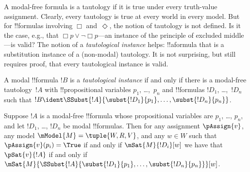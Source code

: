 \documentclass[../../../include/open-logic-section]{subfiles}
\begin{document}


\begin{explain}
A modal-free formula is a tautology if it is true under every
truth-value assignment. Clearly, every tautology is true at every
world in every model. But for !!{formula}s involving $\Box$
and~$\Diamond$, the notion of tautology is not defined. Is it the
case, e.g., that $\Box p \lor \lnot \Box p$---an instance of the
principle of excluded middle---is valid? The notion of a
\emph{tautological instance} helps: !!a{formula} that is a
substitution instance of a (non-modal) tautology. It is not
surprising, but still requires proof, that every tautological instance
is valid.
\end{explain}

\begin{defn}
  A modal !!{formula} $!B$ is a \emph{tautological instance} if and
  only if there is a modal-free tautology~$!A$ with !!{propositional
    variable}s $p_1$, \dots,~$p_n$ and !!{formula}s $!D_1$,
  \dots,~$!D_n$ such that $!B \ident \SSubst{!A}{\subst{!D_1}{p_1},
    \dots, \subst{!D_n}{p_n}}$.
\end{defn}

\begin{lem}
  Suppose $!A$ is a modal-free !!{formula} whose propositional
  variables are $p_1$, \dots, $p_n$, and let $!D_1$, \dots,
  $!D_n$ be modal !!{formula}s. Then for any assignment $\pAssign{v}$,
  any model $\mModel{M} = \tuple{W, R, V}$, and any $w \in W$ such
  that $\pAssign{v}(p_i) = \True$ if and only if $\mSat{M}{!D_i}[w]$ we have
  that $\pSat{v}{!A}$ if and only if
  $\mSat{M}{\SSubst{!A}{\subst{!D_1}{p_1}, \dots,
      \subst{!D_n}{p_n}}}[w]$.
\end{lem}
\end{document}

